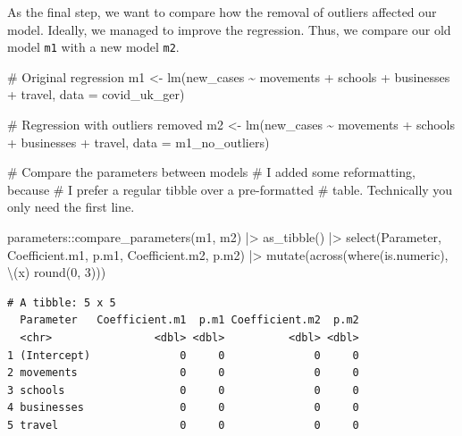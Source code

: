 \documentclass[
  letterpaper,
  DIV=11,
  numbers=noendperiod]{scrreprt}
\newenvironment{Shaded}{\begin{snugshade}}{\end{snugshade}}
\newcommand{\AttributeTok}[1]{\textcolor[rgb]{0.40,0.45,0.13}{#1}}
\newcommand{\CommentTok}[1]{\textcolor[rgb]{0.37,0.37,0.37}{#1}}
\newcommand{\DecValTok}[1]{\textcolor[rgb]{0.68,0.00,0.00}{#1}}
\newcommand{\FunctionTok}[1]{\textcolor[rgb]{0.28,0.35,0.67}{#1}}
\newcommand{\NormalTok}[1]{\textcolor[rgb]{0.00,0.23,0.31}{#1}}
\newcommand{\OtherTok}[1]{\textcolor[rgb]{0.00,0.23,0.31}{#1}}
\newcommand{\SpecialCharTok}[1]{\textcolor[rgb]{0.37,0.37,0.37}{#1}}
\begin{document}
As the final step, we want to compare how the removal of outliers
affected our model. Ideally, we managed to improve the regression. Thus,
we compare our old model \texttt{m1} with a new model \texttt{m2}.

\begin{Shaded}
\begin{Highlighting}[]
\CommentTok{\# Original regression}
\NormalTok{m1 }\OtherTok{\textless{}{-}} \FunctionTok{lm}\NormalTok{(new\_cases }\SpecialCharTok{\textasciitilde{}}\NormalTok{ movements }\SpecialCharTok{+}\NormalTok{ schools }\SpecialCharTok{+}\NormalTok{ businesses }\SpecialCharTok{+}\NormalTok{ travel,}
         \AttributeTok{data =}\NormalTok{ covid\_uk\_ger)}

\CommentTok{\# Regression with outliers removed}
\NormalTok{m2 }\OtherTok{\textless{}{-}} \FunctionTok{lm}\NormalTok{(new\_cases }\SpecialCharTok{\textasciitilde{}}\NormalTok{ movements }\SpecialCharTok{+}\NormalTok{ schools }\SpecialCharTok{+}\NormalTok{ businesses }\SpecialCharTok{+}\NormalTok{ travel,}
         \AttributeTok{data =}\NormalTok{ m1\_no\_outliers)}

\CommentTok{\# Compare the parameters between models}
\CommentTok{\# I added some reformatting, because}
\CommentTok{\# I prefer a regular tibble over a pre{-}formatted}
\CommentTok{\# table. Technically you only need the first line.}

\NormalTok{parameters}\SpecialCharTok{::}\FunctionTok{compare\_parameters}\NormalTok{(m1, m2) }\SpecialCharTok{|\textgreater{}}
  \FunctionTok{as\_tibble}\NormalTok{() }\SpecialCharTok{|\textgreater{}}
  \FunctionTok{select}\NormalTok{(Parameter, Coefficient.m1, p.m1, Coefficient.m2, p.m2) }\SpecialCharTok{|\textgreater{}}
  \FunctionTok{mutate}\NormalTok{(}\FunctionTok{across}\NormalTok{(}\FunctionTok{where}\NormalTok{(is.numeric), \textbackslash{}(x) }\FunctionTok{round}\NormalTok{(}\DecValTok{0}\NormalTok{, }\DecValTok{3}\NormalTok{)))}
\end{Highlighting}
\end{Shaded}

\begin{verbatim}
# A tibble: 5 x 5
  Parameter   Coefficient.m1  p.m1 Coefficient.m2  p.m2
  <chr>                <dbl> <dbl>          <dbl> <dbl>
1 (Intercept)              0     0              0     0
2 movements                0     0              0     0
3 schools                  0     0              0     0
4 businesses               0     0              0     0
5 travel                   0     0              0     0
\end{verbatim}
\end{document}
